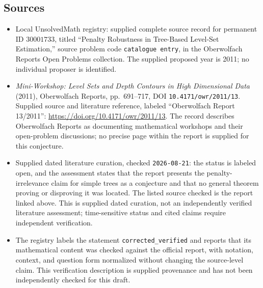 \documentclass[11pt]{article}
\begin{document}
\subsection{Sources}
\begin{itemize}
\item Local UnsolvedMath registry: supplied complete source record for permanent ID \(30001733\), titled ``Penalty Robustness in Tree-Based Level-Set Estimation,'' source problem code \texttt{catalogue entry}, in the Oberwolfach Reports Open Problems collection. The supplied proposed year is 2011; no individual proposer is identified.
\item \emph{Mini-Workshop: Level Sets and Depth Contours in High Dimensional Data} (2011), Oberwolfach Reports, pp.\ 691--717, DOI \texttt{10.4171/owr/2011/13}. Supplied source and literature reference, labeled ``Oberwolfach Report 13/2011'': \url{https://doi.org/10.4171/owr/2011/13}. The record describes Oberwolfach Reports as documenting mathematical workshops and their open-problem discussions; no precise page within the report is supplied for this conjecture.
\item Supplied dated literature curation, checked \texttt{2026-08-21}: the status is labeled open, and the assessment states that the report presents the penalty-irrelevance claim for simple trees as a conjecture and that no general theorem proving or disproving it was located. The listed source checked is the report linked above. This is supplied dated curation, not an independently verified literature assessment; time-sensitive status and cited claims require independent verification.
\item The registry labels the statement \texttt{corrected\_verified} and reports that its mathematical content was checked against the official report, with notation, context, and question form normalized without changing the source-level claim. This verification description is supplied provenance and has not been independently checked for this draft.
\end{itemize}
\end{document}
